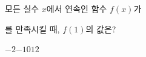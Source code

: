 모든 실수 $x$에서 연속인 함수 $f(x)$가 \par\smallskip{}\par\smallskip\noindent 를 만족시킬 때, $f(1)$의 값은? 
\begin{choices32}{$-2$}{$-1$}{$0$}{$1$}{$2$}\end{choices32}
